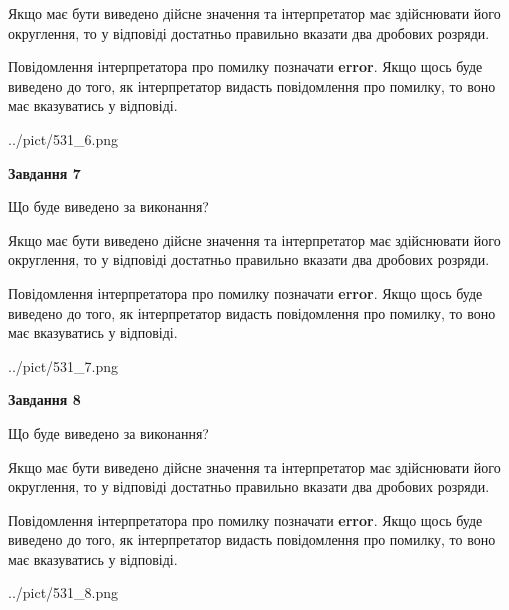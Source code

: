 \documentclass[12pt, ukrainian]{article}
\begin{document}
{\begin {Large}
Якщо має бути виведено дійсне значення та інтерпретатор має здійснювати його округлення, 
то у відповіді достатньо правильно вказати два дробових розряди.

Повідомлення інтерпретатора про помилку позначати \textbf{error}.
Якщо щось буде виведено до того, як інтерпретатор видасть повідомлення про помилку, 
то воно має вказуватись у відповіді. \par

\begin{center}
	{../pict/531_6.png}
\end{center}
\newpage

{\begin {center}\textbf{Завдання 7}\end {center}}\par
Що буде виведено за виконання? \par

Якщо має бути виведено дійсне значення та інтерпретатор має здійснювати його округлення, 
то у відповіді достатньо правильно вказати два дробових розряди.

Повідомлення інтерпретатора про помилку позначати \textbf{error}.
Якщо щось буде виведено до того, як інтерпретатор видасть повідомлення про помилку, 
то воно має вказуватись у відповіді. \par

\begin{center}
	{../pict/531_7.png}
\end{center}
\newpage

{\begin {center}\textbf{Завдання 8}\end {center}}\par
Що буде виведено за виконання? \par

Якщо має бути виведено дійсне значення та інтерпретатор має здійснювати його округлення, 
то у відповіді достатньо правильно вказати два дробових розряди.

Повідомлення інтерпретатора про помилку позначати \textbf{error}.
Якщо щось буде виведено до того, як інтерпретатор видасть повідомлення про помилку, 
то воно має вказуватись у відповіді. \par

\begin{center}
	{../pict/531_8.png}
\end{center}
\newpage


\end{Large}}
\end{document}
